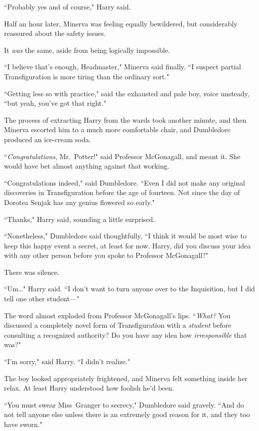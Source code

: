 ``Probably yes and of course," Harry said.

Half an hour later, Minerva was feeling equally bewildered, but considerably reassured about the safety issues.

It \emph{was} the same, aside from being logically impossible.

``I believe that's enough, Headmaster," Minerva said finally. ``I suspect partial Transfiguration is more tiring than the ordinary sort."

``Getting less so with practice," said the exhausted and pale boy, voice unsteady, ``but yeah, you've got that right."

The process of extracting Harry from the wards took another minute, and then Minerva escorted him to a much more comfortable chair, and Dumbledore produced an ice-cream soda.

``\emph{Congratulations}, Mr.~Potter!" said Professor McGonagall, and meant it. She would have bet almost anything against that working.

``Congratulations indeed," said Dumbledore. ``Even I did not make any original discoveries in Transfiguration before the age of fourteen. Not since the day of Dorotea Senjak has any genius flowered so early."

``Thanks," Harry said, sounding a little surprised.

``Nonetheless," Dumbledore said thoughtfully, ``I think it would be most wise to keep this happy event a secret, at least for now. Harry, did you discuss your idea with any other person before you spoke to Professor McGonagall?"

There was silence.

``Um{\ldots}" Harry said. ``I don't want to turn anyone over to the Inquisition, but I did tell one other student—"

The word almost exploded from Professor McGonagall's lips. ``\emph{What?} You discussed a completely novel form of Transfiguration with a \emph{student} before consulting a recognized authority? Do you have any idea how \emph{irresponsible} that was?"

``I'm sorry," said Harry. ``I didn't realize."

The boy looked appropriately frightened, and Minerva felt something inside her relax. At least Harry understood how foolish he'd been.

``You must swear Miss~Granger to secrecy," Dumbledore said gravely. ``And do not tell anyone else unless there is an extremely good reason for it, and they too have sworn."

